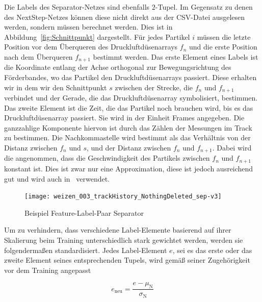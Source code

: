 Die Labels des Separator-Netzes sind ebenfalls \(2\)-Tupel.
Im Gegensatz zu denen des NextStep-Netzes können diese nicht direkt aus der CSV-Datei ausgelesen werden, sondern müssen berechnet werden.
Dies ist in Abbildung~\ref{fig:Schnittpunkt} dargestellt.
Für jedes Partikel \(i\) müssen die letzte Position vor dem Überqueren des Druckluftdüsenarrays \(f_n\) 
und die erste Position nach dem Überqueren \(f_{n+1}\) bestimmt werden. 
Das erste Element eines Labels ist die Koordinate entlang der Achse orthogonal zur Bewegungsrichtung des Förderbandes, wo das Partikel den Druckluftdüsenarrays passiert.
Diese erhalten wir in dem wir den Schnittpunkt \(s\) zwischen der Strecke, die \(f_n\) und \(f_{n+1}\) verbindet und 
der Gerade, die das Druckluftdüsenarray symbolisiert, bestimmen.
Das zweite Element ist die Zeit, die das Partikel noch brauchen wird, bis es das Druckluftdüsenarray passiert.
Sie wird in der Einheit Frames angegeben.
Die ganzzahlige Komponente hiervon ist durch das Zählen der Messungen im Track zu bestimmen.
Die Nachkommastelle wird bestimmt als das Verhältnis von der Distanz zwischen \(f_n\) und \(s\), 
und der Distanz zwischen \(f_n\) und \(f_{n+1}\).
Dabei wird die angenommen, dass die Geschwindigkeit des Partikels zwischen \(f_n\) und \(f_{n+1}\) konstant ist.
Dies ist zwar nur eine Approximation, diese ist jedoch ausreichend gut und wird auch in~\cite{Pfaff2018} verwendet.

\begin{figure}[h]
	\centering
	\texttt{[image: weizen\_003\_trackHistory\_NothingDeleted\_sep-v3]}
	\caption{Beispiel Feature-Label-Paar Separator}
	\label{fig:FLPSep}
\end{figure}


Um zu verhindern, dass verschiedene Label-Elemente basierend auf ihrer Skalierung beim Training unterschiedlich 
stark gewichtet werden, werden sie folgendermaßen standardisiert.
Jedes Label-Element \(e\), sei es das erste oder das zweite Element seines entsprechenden Tupels, wird gemäß seiner Zugehörigkeit vor dem Training angepasst

\begin{equation*}
	e_{\text{neu}} = \frac{e - \mu_{\text{N}}}{\sigma_{\text{N}}}
\end{equation*}

